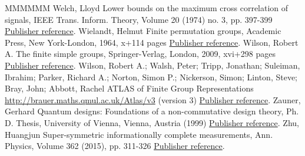 \begin{thebibliography}{MMMMMM}
 Welch, Lloyd Lower bounds on the maximum cross correlation of signals, IEEE Trans. Inform. Theory, Volume 20 (1974) no. 3, pp. 397-399 \href{https://alco.centre-mersenne.org/articles/10.5802/alco.324/#Welch:74}{Publisher reference}.
 Wielandt, Helmut Finite permutation groups, Academic Press, New York-London, 1964, x+114 pages \href{https://alco.centre-mersenne.org/articles/10.5802/alco.324/#Wielandt:64}{Publisher reference}.
 Wilson, Robert A. The finite simple groups, Springer-Verlag, London, 2009, xvi+298 pages \href{https://alco.centre-mersenne.org/articles/10.5802/alco.324/#Wilson:09}{Publisher reference}.
 Wilson, Robert A.; Walsh, Peter; Tripp, Jonathan; Suleiman, Ibrahim; Parker, Richard A.; Norton, Simon P.; Nickerson, Simon; Linton, Steve; Bray, John; Abbott, Rachel ATLAS of Finite Group Representations \url{http://brauer.maths.qmul.ac.uk/Atlas/v3} (version 3) \href{https://alco.centre-mersenne.org/articles/10.5802/alco.324/#AtlasRep}{Publisher reference}.
 Zauner, Gerhard Quantum designs: Foundations of a non-commutative design theory, Ph. D. Thesis, University of Vienna, Vienna, Austria (1999) \href{https://alco.centre-mersenne.org/articles/10.5802/alco.324/#Zauner:99}{Publisher reference}.
 Zhu, Huangjun Super-symmetric informationally complete measurements, Ann. Physics, Volume 362 (2015), pp. 311-326 \href{https://alco.centre-mersenne.org/articles/10.5802/alco.324/#Zhu:15}{Publisher reference}.
\end{thebibliography}
